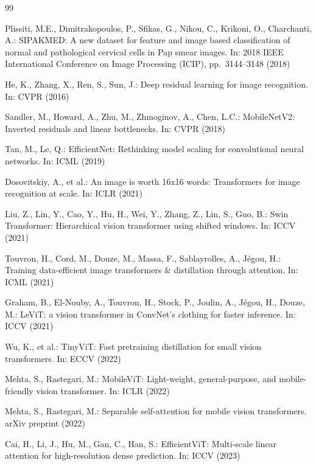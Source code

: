 \documentclass[runningheads]{llncs}
\begin{document}
\begin{thebibliography}{99}

Plissiti, M.E., Dimitrakopoulos, P., Sfikas, G., Nikou, C., Krikoni, O.,
Charchanti, A.: SIPAKMED: A new dataset for feature and image based
classification of normal and pathological cervical cells in Pap smear
images. In: 2018 IEEE International Conference on Image Processing
(ICIP), pp.\ 3144--3148 (2018)

He, K., Zhang, X., Ren, S., Sun, J.: Deep residual learning for image
recognition. In: CVPR (2016)

Sandler, M., Howard, A., Zhu, M., Zhmoginov, A., Chen, L.C.: MobileNetV2:
Inverted residuals and linear bottlenecks. In: CVPR (2018)

Tan, M., Le, Q.: EfficientNet: Rethinking model scaling for convolutional
neural networks. In: ICML (2019)

Dosovitskiy, A., et al.: An image is worth 16x16 words: Transformers for
image recognition at scale. In: ICLR (2021)

Liu, Z., Lin, Y., Cao, Y., Hu, H., Wei, Y., Zhang, Z., Lin, S., Guo, B.:
Swin Transformer: Hierarchical vision transformer using shifted windows.
In: ICCV (2021)

Touvron, H., Cord, M., Douze, M., Massa, F., Sablayrolles, A., J\'egou,
H.: Training data-efficient image transformers \& distillation through
attention. In: ICML (2021)

Graham, B., El-Nouby, A., Touvron, H., Stock, P., Joulin, A., J\'egou, H.,
Douze, M.: LeViT: a vision transformer in ConvNet's clothing for faster
inference. In: ICCV (2021)

Wu, K., et al.: TinyViT: Fast pretraining distillation for small vision
transformers. In: ECCV (2022)

Mehta, S., Rastegari, M.: MobileViT: Light-weight, general-purpose, and
mobile-friendly vision transformer. In: ICLR (2022)

Mehta, S., Rastegari, M.: Separable self-attention for mobile vision
transformers. arXiv preprint (2022)

Cai, H., Li, J., Hu, M., Gan, C., Han, S.: EfficientViT: Multi-scale
linear attention for high-resolution dense prediction. In: ICCV (2023)


\end{thebibliography}
\end{document}
